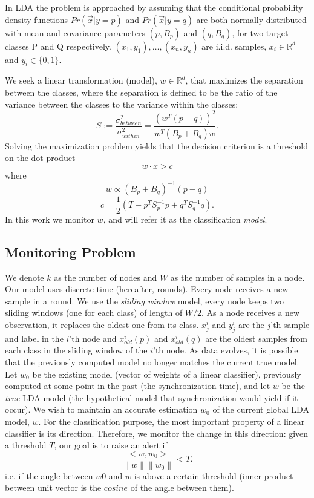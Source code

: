 \documentclass{vldb}
\begin{document}
In LDA the problem is approached by assuming that the conditional probability
density functions $Pr(\vec x|y=p)$ and $Pr(\vec x|y=q)$ are both normally distributed with
mean and covariance parameters $(p, B_p)$ and
$(q, B_q)$, for two target classes P and Q respectively.
${(x_1,y_1),\ldots,(x_n,y_n)}$ are i.i.d. samples, $x_i \in \mathbb{R}^d$
and $y_i \in \{0,1\}$.

We seek a linear transformation (model), $w \in \mathbb{R}^d $,
that maximizes the separation between the classes, where the separation is
defined to be the ratio of the variance between the classes to the variance
within the classes:
\begin{equation}
S := \frac{\sigma^2_{between}}{\sigma^2_{within}} = \frac{(w^T (p -
q))^2}{w^T(B_p+B_q)w}.
\end{equation}
Solving the maximization problem yields that the decision criterion is a threshold on the
dot product
\begin{equation*} \label{eq:decision}
w \cdot x > c
\end{equation*}
where
\begin{equation} \label{eq:w}
w \propto (B_p+B_q)^{-1}(p - q)
\end{equation}
\begin{equation} \label{eq:c}
c = \frac{1}{2}(T-{p}^T S_p^{-1} {p}+{q}^T S_q^{-1} {q}).
\end{equation}
In this work we monitor $w$, and will refer it as the classification \textit{model}.

\subsection{Monitoring Problem}
We denote $k$ as the number of nodes and $W$ as the number of samples in a node.
Our model uses discrete time (hereafter, rounds). Every node receives a new sample
in a round. We use the \textit{sliding window} model, every node keeps two sliding windows (one for each class) of length of $W/2$. As a node receives a new observation, it replaces the oldest one from its class.
$x^i_j$ and $y^i_j$ are the $j$'th sample and label in the $i$'th node
and $x_{old}^i(p)$ and $x_{old}^i(q)$ are the oldest samples from each class in
the sliding window of the $i$'th node.
As data evolves, it is possible that the previously computed model
no longer matches the current true model. Let $w_0$ be the existing model (vector of weights of a linear classifier), previously computed at some point in the past (the synchronization time), and let $w$ be the \textit{true} LDA model (the hypothetical model that synchronization would yield if it occur).
We wish to maintain an accurate estimation $w_0$ of the current global LDA model, $w$.
For the classification purpose, the most important property of a linear classifier is its direction. Therefore, we monitor the change in this direction: given a threshold $T$, our goal is to raise an alert if
\begin{equation} \label{eq:coneCritiria}
\frac{<w,w_0>}{\parallel w \parallel \parallel w_0 \parallel}  < T.
\end{equation}
i.e. if the angle between $w0$ and $w$ is above a certain threshold (inner product between unit vector is the $cosine$ of the angle between them).
\end{document}

